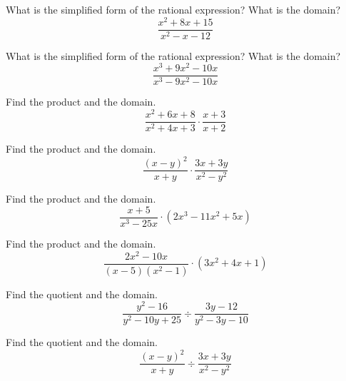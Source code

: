 \documentclass{article}
\newenvironment{practice}[2]{}{}        %
\newcommand{\answer}[1]{}               %
\begin{document}
\begin{practice}{24}{1}
What is the simplified form of the rational expression? What is the domain?
\[
\frac{x^2+8x+15}{x^2-x-12}
\]

\answer{$\frac{x+5}{x-4}$, $x\neq-3,4$.}
\end{practice}

\begin{practice}{25}{1}
What is the simplified form of the rational expression? What is the domain?
\[
\frac{x^3+9x^2-10x}{x^3-9x^2-10x}
\]

\answer{$\frac{(x+10)(x-1)}{(x-10)(x+1)}$, $x\neq-1,0,10$.}
\end{practice}

\begin{practice}{26}{1}
Find the product and the domain.
\[
\frac{x^2+6x+8}{x^2+4x+3}\cdot\frac{x+3}{x+2}
\]

\answer{$\frac{x+4}{x+1}$ for all $x$ except $-3$, $-2$, and $-1$.}
\end{practice}

\begin{practice}{27}{1}
Find the product and the domain.
\[
\frac{(x-y)^2}{x+y}\cdot\frac{3x+3y}{x^2-y^2}
\]

\answer{$\frac{3(x-y)}{x+y}$ for all real numbers except $x=y$ or $x=-y$.}
\end{practice}

\begin{practice}{28}{1}
Find the product and the domain.
\[
\frac{x+5}{x^3-25x}\cdot(2x^3-11x^2+5x)
\]

\answer{$2x-1$ for all $x$ except $0$, $-5$, and $5$.}
\end{practice}

\begin{practice}{29}{1}
Find the product and the domain.
\[
\frac{2x^2-10x}{(x-5)(x^2-1)}\cdot(3x^2+4x+1)
\]

\answer{$\frac{2x(3x+1)}{x-1}$ for all $x$ except $-1$, $1$, and $5$.}
\end{practice}

\begin{practice}{30}{1}
Find the quotient and the domain.
\[
\frac{y^2-16}{y^2-10y+25}\div\frac{3y-12}{y^2-3y-10}
\]

\answer{$\frac{(y+4)(y+2)}{3(y-5)}$ for all $y$ except $4$ and $5$.}
\end{practice}

\begin{practice}{31}{1}
Find the quotient and the domain.
\[
\frac{(x-y)^2}{x+y}\div\frac{3x+3y}{x^2-y^2}
\]

\answer{$\frac{(x-y)^3}{3(x+y)}$ for all $x$ except $x=-y$.}
\end{practice}
\end{document}
